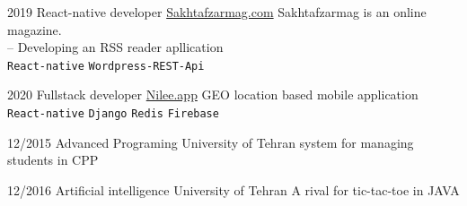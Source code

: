 \documentclass[9pt]{developercv}
\begin{document}


\begin{entrylist}
	\entry
	{2019}
	{React-native developer}
	{{\href{https://www.sakhtafzarmag.com/}{Sakhtafzarmag.com}}}
	{
		Sakhtafzarmag is an online magazine. \\
		-- Developing an RSS reader apllication \\
		\texttt{React-native}\slashsep
		\texttt{Wordpress-REST-Api}\slashsep
	}
\end{entrylist}
\begin{entrylist}
	\entry
	{2020}
	{Fullstack developer}
	{{\href{https://www.nilee.app/}{Nilee.app}}}
	{
		GEO location based mobile application \\
		\texttt{React-native}\slashsep
		\texttt{Django}\slashsep
		\texttt{Redis}\slashsep
		\texttt{Firebase}
	}
\end{entrylist}




\begin{entrylist}
	\entry
	{12/2015}
	{Advanced Programing}
	{University of Tehran}
	{system for managing students in CPP}
\end{entrylist}
\begin{entrylist}
	\entry
	{12/2016}
	{Artificial intelligence}
	{University of Tehran}
	{A rival for tic-tac-toe in JAVA}
\end{entrylist}




\end{document}
